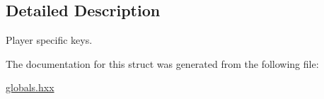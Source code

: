 \subsection{Detailed Description}
Player specific keys. 

The documentation for this struct was generated from the following file\-:\begin{DoxyCompactItemize}
\item 
\hyperlink{globals_8hxx}{globals.\-hxx}\end{DoxyCompactItemize}
